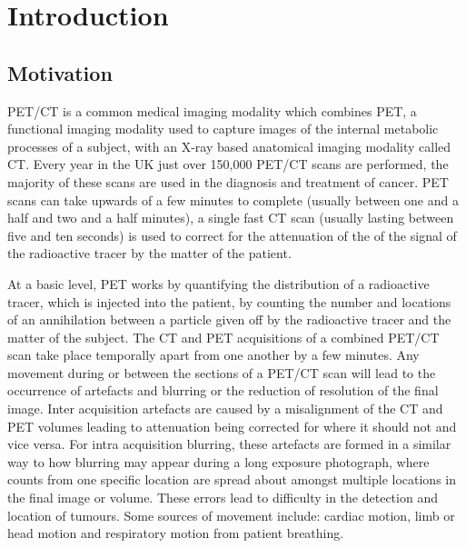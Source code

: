 \chapter{Introduction} \label{introduction}
    \blindtext
    
    \section{Motivation} \label{motivation}
        \gls{PET}/\gls{CT} is a common medical imaging modality which combines \gls{PET}, a functional imaging modality used to capture images of the internal metabolic processes of a subject, with an X-ray based anatomical imaging modality called \gls{CT}. Every year in the UK just over 150,000 \gls{PET}/\gls{CT} scans are performed, the majority of these scans are used in the diagnosis and treatment of cancer. \gls{PET} scans can take upwards of a few minutes to complete (usually between one and a half and two and a half minutes), a single fast \gls{CT} scan (usually lasting between five and ten seconds) is used to correct for the attenuation of the of the signal of the radioactive tracer by the matter of the patient.
        
        At a basic level, \gls{PET} works by quantifying the distribution of a radioactive tracer, which is injected into the patient, by counting the number and locations of an annihilation between a particle given off by the radioactive tracer and the matter of the subject. The \gls{CT} and \gls{PET} acquisitions of a combined \gls{PET}/\gls{CT} scan take place temporally apart from one another by a few minutes. Any movement during or between the sections of a \gls{PET}/\gls{CT} scan will lead to the occurrence of artefacts and blurring or the reduction of resolution of the final image. Inter acquisition artefacts are caused by a misalignment of the \gls{CT} and \gls{PET} volumes leading to attenuation being corrected for where it should not and vice versa. For intra acquisition blurring, these artefacts are formed in a similar way to how blurring may appear during a long exposure photograph, where counts from one specific location are spread about amongst multiple locations in the final image or volume. These errors lead to difficulty in the detection and location of tumours. Some sources of movement include: cardiac motion, limb or head motion and respiratory motion from patient breathing.
        
